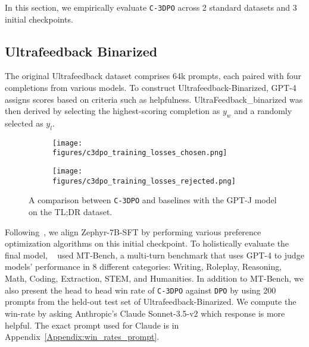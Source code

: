 In this section, we empirically evaluate \texttt{C-3DPO} across 2 standard datasets and 3 initial checkpoints.
\subsection{\textrm{Ultrafeedback Binarized}}
The original \textrm{Ultrafeedback} dataset comprises 64k prompts, each paired with four completions from various models. To construct \textrm{Ultrafeedback-Binarized}, GPT-4 assigns scores based on criteria such as helpfulness. \textrm{UltraFeedback\_binarized} was then derived by selecting the highest-scoring completion as $y_w$ and a randomly selected as $y_l$.

\begin{figure}[h]  %
   \centering
   \begin{subfigure}{0.225\textwidth}
       \centering
       \texttt{[image: figures/c3dpo\_training\_losses\_chosen.png]}
   \end{subfigure}
   \begin{subfigure}{0.225\textwidth}
       \centering
       \texttt{[image: figures/c3dpo\_training\_losses\_rejected.png]}
   \end{subfigure}
   \caption{A comparison between \texttt{C-3DPO} and baselines with the GPT-J model on the TL;DR dataset. }
   \label{fig:training_losses}
\end{figure}

Following~\citet{rasul2024preference}, we align \textrm{Zephyr-7B-SFT} by performing various preference optimization algorithms on this initial checkpoint. To holistically evaluate the final model, ~\citet{rasul2024preference} used MT-Bench, a multi-turn benchmark that uses GPT-4 to judge models’ performance in $8$ different categories: Writing, Roleplay, Reasoning, Math, Coding, Extraction, STEM, and Humanities. In addition to MT-Bench, we also present the head to head win rate of \texttt{C-3DPO} against \texttt{DPO} by using 200 prompts from the held-out test set of \textrm{Ultrafeedback-Binarized}. We compute the win-rate by asking Anthropic's Claude Sonnet-3.5-v2 which response is more helpful. The exact prompt used for Claude is in Appendix~\ref{Appendix:win_rates_prompt}.

